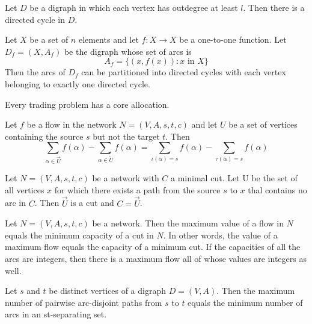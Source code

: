 \begin{lemma}
  \label{lem:13.1.7}
  Let $D$ be a digraph in which each vertex has outdegree at least $l$. Then there is a directed cycle in $D$.
\end{lemma}

\begin{corollary}
  \label{cor:13.1.8}
  Let $X$ be a set of $n$ elements and let $f: X \rightarrow X$ be a one-to-one function. Let $D_f=\left(X, A_f\right)$ be the digraph whose set of arcs is
  $$
  A_f=\{(x, f(x)): x \text { in } X\}
  $$
  Then the arcs of $D_f$ can be partitioned into directed cycles with each vertex belonging to exactly one directed cycle.
\end{corollary}

\begin{theorem}
  \label{thm:13.1.9}
  Every trading problem has a core allocation.
\end{theorem}

\begin{lemma}
  \label{lem:13.2.1}
  Let $f$ be a flow in the network $N=(V, A, s, t, c)$ and let $U$ be a set of vertices containing the source $s$ but not the target $t$. Then
  $$
  \sum\limits_{\alpha \in \vec{U}} f(\alpha)-\sum\limits_{\alpha \in \overleftarrow{U}} f(\alpha)=\sum\limits_{\iota(\alpha)=s} f(\alpha)-\sum\limits_{\tau(\alpha)=s} f(\alpha)
  $$
\end{lemma}

\begin{lemma}
  \label{lem:13.2.2}
  Let $N=(V, A, s, t, c)$ be a network with $C$ a minimal cut. Let U be the set of all vertices $x$ for which there exists a path from the source $s$ to $x$ thal contains no arc in $C$. Then $\vec{U}$ is a cut and $C=\vec{U}$.
\end{lemma}

\begin{theorem}
  \label{thm:13.2.3}
  Let $N=(V, A, s, t, c)$ be a network. Then the maximum value of a flow in $N$ equals the minimum capacity of a cut in $N$. In other words, the value of a maximum flow equals the capacity of a minimum cut. If the capacities of all the arcs are integers, then there is a maximum flow all of whose values are integers as well.
\end{theorem}

\begin{theorem}
  \label{thm:13.2.4}
  Let $s$ and $t$ be distinct vertices of a digraph $D = (V, A)$. Then the maximum number of pairwise arc-disjoint paths from $s$ to $t$ equals the minimum number of arcs in an st-separating set.
\end{theorem}

